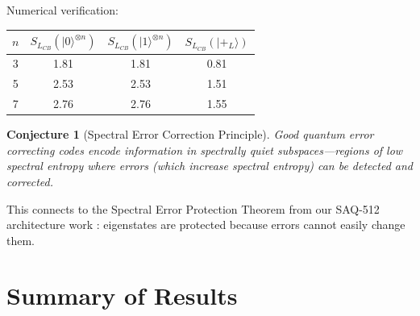 \documentclass[11pt,a4paper]{article}
\theoremstyle{plain}
\newtheorem{conjecture}[theorem]{Conjecture}
\theoremstyle{definition}
\theoremstyle{remark}
\newcommand{\ket}[1]{|#1\rangle}
\begin{document}
Numerical verification:

\begin{center}
\begin{tabular}{c|ccc}
\toprule
$n$ & $S_{L_{CB}}(\ket{0}^{\otimes n})$ & $S_{L_{CB}}(\ket{1}^{\otimes n})$ & $S_{L_{CB}}(\ket{+_L})$ \\
\midrule
3 & 1.81 & 1.81 & 0.81 \\
5 & 2.53 & 2.53 & 1.51 \\
7 & 2.76 & 2.76 & 1.55 \\
\bottomrule
\end{tabular}
\end{center}

\begin{conjecture}[Spectral Error Correction Principle]
Good quantum error correcting codes encode information in \emph{spectrally quiet} subspaces---regions of low spectral entropy where errors (which increase spectral entropy) can be detected and corrected.
\end{conjecture}

This connects to the Spectral Error Protection Theorem from our SAQ-512 architecture work \cite{saq-512}: eigenstates are protected because errors cannot easily change them.

\section{Summary of Results}
\end{document}
